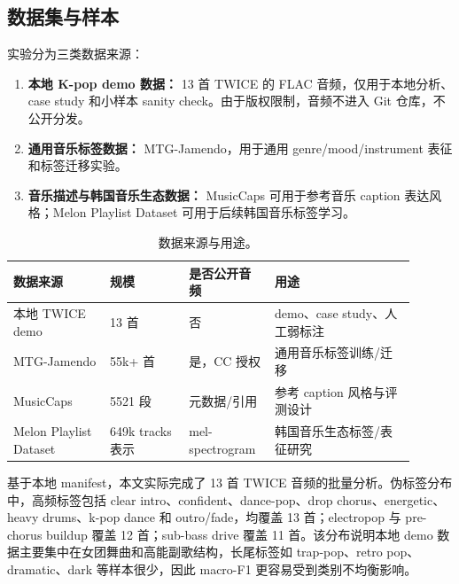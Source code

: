 \documentclass[UTF8,zihao=-4]{ctexart}
\begin{document}
\subsection{数据集与样本}

实验分为三类数据来源：

\begin{enumerate}[leftmargin=2em]
    \item \textbf{本地 K-pop demo 数据：} 13 首 TWICE 的 FLAC 音频，仅用于本地分析、case study 和小样本 sanity check。由于版权限制，音频不进入 Git 仓库，不公开分发。
    \item \textbf{通用音乐标签数据：} MTG-Jamendo，用于通用 genre/mood/instrument 表征和标签迁移实验\cite{bogdanov2019mtgjamendo}。
    \item \textbf{音乐描述与韩国音乐生态数据：} MusicCaps 可用于参考音乐 caption 表达风格\cite{musiccaps2023}；Melon Playlist Dataset 可用于后续韩国音乐标签学习\cite{ferraro2021melon}。
\end{enumerate}

\begin{table}[H]
\centering
\caption{数据来源与用途。}
\small
\begin{tabular}{p{0.22\linewidth}p{0.18\linewidth}p{0.18\linewidth}p{0.32\linewidth}}
\toprule
数据来源 & 规模 & 是否公开音频 & 用途 \\
\midrule
本地 TWICE demo & 13 首 & 否 & demo、case study、人工弱标注 \\
MTG-Jamendo & 55k+ 首 & 是，CC 授权 & 通用音乐标签训练/迁移 \\
MusicCaps & 5521 段 & 元数据/引用 & 参考 caption 风格与评测设计 \\
Melon Playlist Dataset & 649k tracks 表示 & mel-spectrogram & 韩国音乐生态标签/表征研究 \\
\bottomrule
\end{tabular}
\end{table}

基于本地 manifest，本文实际完成了 13 首 TWICE 音频的批量分析。伪标签分布中，高频标签包括 clear intro、confident、dance-pop、drop chorus、energetic、heavy drums、k-pop dance 和 outro/fade，均覆盖 13 首；electropop 与 pre-chorus buildup 覆盖 12 首；sub-bass drive 覆盖 11 首。该分布说明本地 demo 数据主要集中在女团舞曲和高能副歌结构，长尾标签如 trap-pop、retro pop、dramatic、dark 等样本很少，因此 macro-F1 更容易受到类别不均衡影响。
\end{document}
